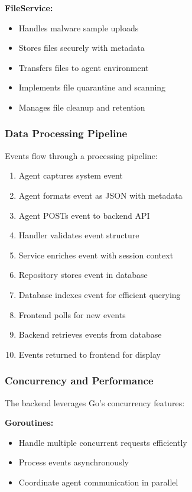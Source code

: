 \textbf{FileService:}
\begin{itemize}
    \item Handles malware sample uploads
    \item Stores files securely with metadata
    \item Transfers files to agent environment
    \item Implements file quarantine and scanning
    \item Manages file cleanup and retention
\end{itemize}

\subsubsection{Data Processing Pipeline}

Events flow through a processing pipeline:

\begin{enumerate}
    \item Agent captures system event
    \item Agent formats event as JSON with metadata
    \item Agent POSTs event to backend API
    \item Handler validates event structure
    \item Service enriches event with session context
    \item Repository stores event in database
    \item Database indexes event for efficient querying
    \item Frontend polls for new events
    \item Backend retrieves events from database
    \item Events returned to frontend for display
\end{enumerate}

\subsubsection{Concurrency and Performance}

The backend leverages Go's concurrency features:

\textbf{Goroutines:}
\begin{itemize}
    \item Handle multiple concurrent requests efficiently
    \item Process events asynchronously
    \item Coordinate agent communication in parallel
\end{itemize}

